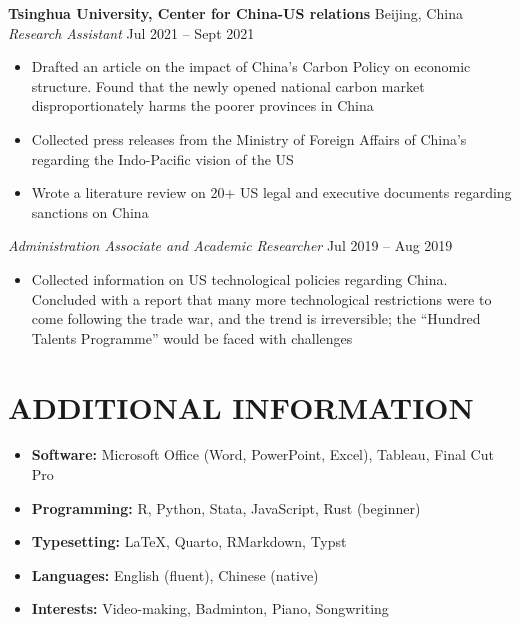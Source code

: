 \documentclass[a4paper,9pt]{extarticle}
\begin{document}
\noindent
\textbf{Tsinghua University, Center for China-US relations} \hfill Beijing, China\\
\textit{Research Assistant} \hfill Jul 2021 – Sept 2021
\begin{itemize}
    \item Drafted an article on the impact of China’s Carbon Policy on economic structure. Found that the newly opened national carbon market disproportionately harms the poorer provinces in China
    \item Collected press releases from the Ministry of Foreign Affairs of China’s regarding the Indo-Pacific vision of the US
    \item Wrote a literature review on 20+ US legal and executive documents regarding sanctions on China
\end{itemize}
\textit{Administration Associate and Academic Researcher} \hfill Jul 2019 – Aug 2019
\begin{itemize}
    \item Collected information on US technological policies regarding China. Concluded with a report that many more technological restrictions were to come following the trade war, and the trend is irreversible; the “Hundred Talents Programme” would be faced with challenges
\end{itemize}
\section*{ADDITIONAL INFORMATION}
\begin{itemize}
    \item \textbf{Software:} Microsoft Office (Word, PowerPoint, Excel), Tableau, Final Cut Pro
    \item \textbf{Programming:} R, Python, Stata, JavaScript, Rust (beginner)
    \item \textbf{Typesetting:} \LaTeX, Quarto, RMarkdown, Typst
    \item \textbf{Languages:} English (fluent), Chinese (native)
    \item \textbf{Interests:} Video-making, Badminton, Piano, Songwriting
\end{itemize}

\end{document}
